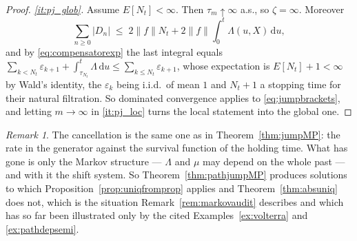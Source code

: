 \documentclass[11pt,a4paper]{article}
\theoremstyle{plain}
\theoremstyle{definition}
\theoremstyle{remark}
\newtheorem{remark}[theorem]{Remark}
\newcommand{\dif}{\,\mathrm{d}}
\begin{document}
\begin{proof}
  \emph{\ref{it:pj_glob}.}  Assume $E[N_t] < \infty$.  Then
  $\tau_m \uparrow \infty$ a.s., so $\zeta = \infty$.  Moreover
  \[
    \sum_{n \geq 0} |D_n| \;\leq\; 2\lVert f\rVert N_t
      + 2\lVert f\rVert \int_0^t \Lambda(u,X) \dif u ,
  \]
  and by \eqref{eq:compensatorexp} the last integral equals
  $\sum_{k < N_t}\varepsilon_{k+1} + \int_{\tau_{N_t}}^{t}\Lambda \dif u
   \leq \sum_{k \leq N_t}\varepsilon_{k+1}$, whose expectation is
  $E[N_t] + 1 < \infty$ by Wald's identity, the $\varepsilon_k$ being i.i.d.\ of
  mean $1$ and $N_t + 1$ a stopping time for their natural filtration.  So
  dominated convergence applies to \eqref{eq:jumpbrackets}, and letting
  $m \to \infty$ in \ref{it:pj_loc} turns the local statement into the global one.
\end{proof}

\begin{remark}
  \label{rem:pathjumpsplit}
  The cancellation is the same one as in Theorem~\ref{thm:jumpMP}: the rate in the
  generator against the survival function of the holding time.  What has gone is
  only the Markov structure --- $\Lambda$ and $\mu$ may depend on the whole past
  --- and with it the shift system.  So Theorem~\ref{thm:pathjumpMP} produces
  solutions to which Proposition~\ref{prop:uniqfromprop} applies and
  Theorem~\ref{thm:absuniq} does not, which is the situation
  Remark~\ref{rem:markovaudit} describes and which has so far been illustrated only
  by the cited Examples~\ref{ex:volterra} and \ref{ex:pathdepsemi}.
\end{remark}
\end{document}
